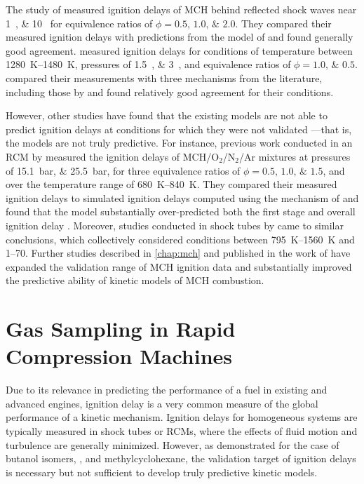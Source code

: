 \documentclass[../main.tex]{subfiles}
\begin{document}
The study of \textcite{Rotavera2013} measured ignition delays of MCH behind
reflected shock waves near \SIlist{1;10}{\atmosphere} for equivalence
ratios of $\phi = \numlist{0.5;1.0;2.0}$. They compared their measured ignition
delays with predictions from the model of \textcite{Pitz2007} and found
generally good agreement. \textcite{Hong2011} measured ignition delays
for conditions of temperature between \SIrange{1280}{1480}{\kelvin}, pressures
of \SIlist{1.5;3}{\atmosphere}, and equivalence ratios of $\phi = \numlist{1.0;0.5}$.
\textcite{Hong2011} compared their measurements with three mechanisms
from the literature, including those by \textcite{Pitz2007, Orme2006}
and found relatively good agreement for their conditions.

However, other studies have found that the existing models are not able
to predict ignition delays at conditions for which they were not validated%
---that is, the models are not truly predictive. For instance, previous work
conducted in an RCM by \textcite{Mittal2009} measured the ignition delays
of MCH/O$_2$/N$_2$/Ar mixtures at pressures of \SIlist{15.1;25.5}{\bar},
for three equivalence ratios of $\phi = \numlist{0.5;1.0;1.5}$, and over
the temperature range of \SIrange{680}{840}{\kelvin}. They compared
their measured ignition delays to simulated ignition delays computed
using the mechanism of \textcite{Pitz2007} and found that the model
substantially over-predicted both the first stage and overall ignition delay
\cite{Mittal2009}. Moreover, studies conducted in shock tubes by
\textcite{Vasu2009, Vanderover2009} came to similar conclusions, which
collectively considered conditions between \SIrange{795}{1560}{\kelvin}
and \SIrange{1}{70}{\atmosphere}. Further studies described in \cref{chap:mch}
and published in the work of \textcite{Weber2014} have expanded the
validation range of MCH ignition data and substantially improved the
predictive ability of kinetic models of MCH combustion.

\section{Gas Sampling in Rapid Compression Machines}

Due to its relevance in predicting the performance of a fuel in existing
and advanced engines, ignition delay is a very common measure of the
global performance of a kinetic mechanism. Ignition delays for homogeneous
systems are typically measured in shock tubes or RCMs, where the effects
of fluid motion and turbulence are generally minimized. However, as demonstrated
for the case of butanol isomers, \iPeOH{}, and methylcyclohexane, the
validation target of ignition delays is necessary but not sufficient to
develop truly predictive kinetic models.
\end{document}
